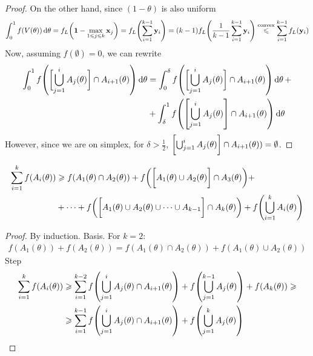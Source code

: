 \begin{lemma}
\begin{proof}
		On the other hand, since $(1-\theta)$ is also uniform 
		\begin{align}
		\int_{0}^1 f(V(\theta)) \dd{\theta}= f_L\qty(\vb{1} - \max\limits_{1\leqslant j \leqslant k} \vb{x}_j) = f_L\qty(\sum_{i=1}^{k-1} \vb{y}_i)= (k-1)f_L\qty(\frac{1}{k-1}\sum_{i=1}^{k-1} \vb{y}_i) \stackrel{\text{convex}}{\leqslant} \sum_{i=1}^{k-1}f_L\qty( \vb{y}_i)
		\end{align}
		Now, assuming $f(\emptyset) = 0$, we can rewrite
		\begin{align}
		\int_0^1 f\qty(\qty\bigg[ \bigcup_{j=1}^{i} A_j(\theta)] \cap A_{i+1}(\theta)) \dd{\theta} &= \int_0^\delta f\qty(\qty\bigg[ \bigcup_{j=1}^{i} A_j(\theta)] \cap A_{i+1}(\theta)) \dd{\theta} +\\&+ \int_\delta^1 f\qty(\qty[ \bigcup_{j=1}^{i} A_j(\theta)] \cap A_{i+1}(\theta)) \dd{\theta}
		\end{align}
		However, since we are on simplex, for $\delta>\frac{1}{2}$, $\qty\bigg[ \bigcup_{j=1}^{i} A_j(\theta)] \cap A_{i+1}(\theta)) =\emptyset$.
	\end{proof}
\end{lemma}
\begin{lemma}\label{th:delta_lemma2}
	\begin{align}
	\sum_{i=1}^k f(A_i(\theta)) &\geqslant f(A_1(\theta) \cap A_2(\theta)) + f\qty(\qty\bigg[A_1(\theta) \cup A_2(\theta)] \cap A_3(\theta)) +\\&+ \dots + f\qty(\qty\bigg[A_1(\theta) \cup A_2(\theta) \cup \dots \cup A_{k-1}] \cap A_k(\theta)) + f\qty(\bigcup_{i=1}^k A_i(\theta) ) 
	\end{align}
	\begin{proof}
		By induction. Basis. For $k=2$:
		\begin{align}
		f(A_1(\theta))+f(A_2(\theta)) = f(A_1(\theta) \cap A_2(\theta)) +f(A_1(\theta) \cup A_2(\theta)) 
		\end{align}
		Step
		\begin{align}
			\sum_{i=1}^k f(A_i(\theta)) &\geqslant \sum_{i=1}^{k-2} f\qty(\bigcup_{j=1}^i A_j(\theta) \cap A_{i+1}(\theta)) + f\qty(\bigcup_{j=1}^{k-1} A_{j}(\theta)) + f(A_k(\theta)) \geqslant\\&\geqslant  \sum_{i=1}^{k-1} f\qty(\bigcup_{j=1}^i A_j(\theta) \cap A_{i+1}(\theta))+ f\qty(\bigcup_{j=1}^{k} A_{j}(\theta))  
		\end{align}
	\end{proof}
\end{lemma}
